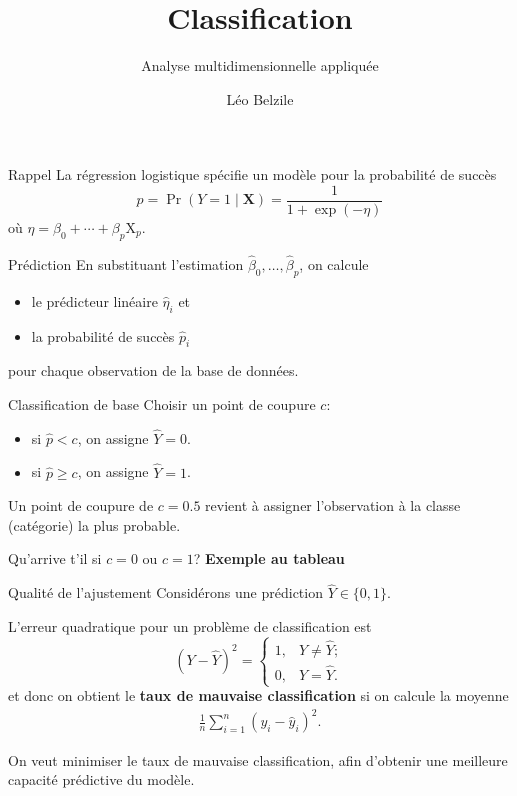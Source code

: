 \documentclass[
  ignorenonframetext,
]{beamer}
\title{Classification}
\subtitle{Analyse multidimensionnelle appliquée}
\author{Léo Belzile}
\date{}
\institute{HEC Montréal}
\providecommand{\tightlist}{%
  \setlength{\itemsep}{0pt}\setlength{\parskip}{0pt}}\usepackage{longtable,booktabs,array}
\begin{document}
\frame{\titlepage}


\begin{frame}{Rappel}
\label{rappel}
La régression logistique spécifie un modèle pour la probabilité de
succès \[p = \Pr(Y=1 \mid \mathbf{X}) = \frac{1}{1+\exp(-\eta)}\] où
\(\eta = \beta_0 + \cdots + \beta_p \mathrm{X}_p\).
\end{frame}

\begin{frame}{Prédiction}
\label{pruxe9diction}
En substituant l'estimation
\(\widehat{\beta}_0, \ldots, \widehat{\beta}_p\), on calcule

\begin{itemize}
\tightlist
\item
  le prédicteur linéaire \(\widehat{\eta}_i\) et
\item
  la probabilité de succès \(\widehat{p}_i\)
\end{itemize}

pour chaque observation de la base de données.
\end{frame}

\begin{frame}{Classification de base}
\label{classification-de-base}
Choisir un point de coupure \(c\):

\begin{itemize}
\tightlist
\item
  si \(\widehat{p} < c\), on assigne \(\widehat{Y}=0\).
\item
  si \(\widehat{p} \geq c\), on assigne \(\widehat{Y}=1\).
\end{itemize}

Un point de coupure de \(c=0.5\) revient à assigner l'observation à la
classe (catégorie) la plus probable.

Qu'arrive t'il si \(c=0\) ou \(c=1\)? \textbf{Exemple au tableau}
\end{frame}

\begin{frame}{Qualité de l'ajustement}
\label{qualituxe9-de-lajustement}
Considérons une prédiction \(\widehat{Y} \in \{0,1\}\).

L'erreur quadratique pour un problème de classification est
\[(Y-\widehat{Y})^2 = \begin{cases} 1, & Y \neq \widehat{Y}; \\0, & Y = \widehat{Y}.\end{cases}\]
et donc on obtient le \textbf{taux de mauvaise classification} si on
calcule la moyenne \begin{align*}
\frac{1}{n} \sum_{i=1}^n (y_i - \widehat{y}_i)^2.
\end{align*}

On veut minimiser le taux de mauvaise classification, afin d'obtenir une
meilleure capacité prédictive du modèle.
\end{frame}
\end{document}
